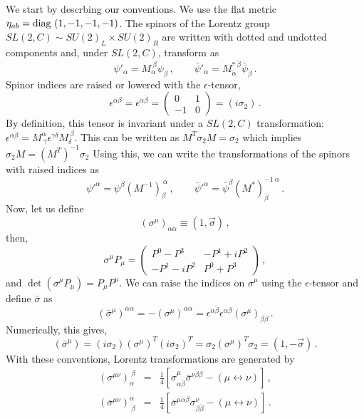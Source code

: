 We start by descrbing our conventions. We use the flat metric
$\eta_{ab} = {\rm diag}~ (1,-1,-1,-1)$. The spinors of the Lorentz
group $SL(2, C)\sim SU(2)_L\times SU(2)_R$ are written with dotted and
undotted components and, under $SL(2,C)$, transform as 
$$
\psi'_\alpha = M_{\alpha}^{~\beta} \psi_\beta\,, \qquad
\bar\psi'_{\dot{\alpha}} = M^{*~\dot{\beta}}_{\dot{\alpha}}
\bar{\psi}_{\dot{\beta}}\,.
$$
Spinor indices are raised or lowered with the $\epsilon$-tensor,
$$
\epsilon^{\alpha \beta} = \epsilon^{\dot{\alpha}\dot{\beta}} =
\left( \begin{array}{lr}
0 & 1 \\
-1 & 0
\end{array} \right) =
(i \sigma_{2})\,.
$$
By definition, this tensor is invariant under a $SL(2,C)$
transformation: $\epsilon^{\alpha \beta} = M_{~\gamma}^{\alpha}
\epsilon^{\gamma \delta}M_{\delta}^{~\beta}$. This can be written as 
$M^T\sigma_2 M=\sigma_2$ which implies $\sigma_2 M=(M^T)^{-1}\sigma_2$
Using this, we can write the transformations of the spinors with
raised indices as
$$
\psi'^\alpha =\psi^\beta (M^{-1})^{~\alpha}_{\beta}\,,\qquad
\bar{\psi}'^{\dot{\alpha}} = \bar{\psi}^{\dot{\beta}}
(M^*)^{-1~\dot{\alpha}}_{\dot{\beta}}\,.
$$
Now, let us define
$$
(\sigma^\mu)_{\alpha \dot{\alpha}} \equiv (1, \vec{\sigma})\,,
$$
then, 
$$
\sigma^\mu P_\mu = \left ( \begin{array}{lr}
P^{0} - P^{3} & -P^{1} + i P^{2} \\
-P^{1} - iP^{2} & P^{0} + P^{3}
\end{array} \right )\,, 
$$
and $\det(\sigma^\mu P_\mu)=P_\mu P^\mu$. We can raise the indices on 
$\sigma^\mu$ using the $\epsilon$-tensor and define $\bar\sigma$ as
$$
(\bar{\sigma}^\mu)^{\dot{\alpha}\alpha}=-(\sigma^\mu)^{\alpha\dot{\alpha}}
=\epsilon^{\dot{\alpha}\dot{\beta}}\epsilon^{\alpha \beta}
(\sigma^\mu)_{\beta \dot{\beta}}\,. 
$$
Numerically, this gives,
$$
(\bar{\sigma}^\mu) = (i\sigma_2) (\sigma^\mu)^T (i\sigma_2)^T =
\sigma_2 (\sigma^\mu)^T\sigma_2 = (1, - \vec{\sigma})\,.
$$
With these conventions, Lorentz transformations are generated by
\begin{eqnarray}
(\sigma^{\mu\nu})_\alpha^{~\beta} & = & \frac{1}{4}
[\sigma^\mu_{\alpha \dot{\beta}} \bar{\sigma}^{\nu\dot{\beta}\beta}- 
(\mu \leftrightarrow \nu)]\,, \nonumber \\
(\bar{\sigma}^{\mu\nu})^{\dot{\alpha}}_{\dot{~\beta}}&=&\frac{1}{4}
[\bar{\sigma}^{\mu\dot{\alpha}\beta}\sigma^\nu_{\beta\dot{\beta}}-
(\mu\leftrightarrow \nu)]\,.\nonumber
\end{eqnarray}
